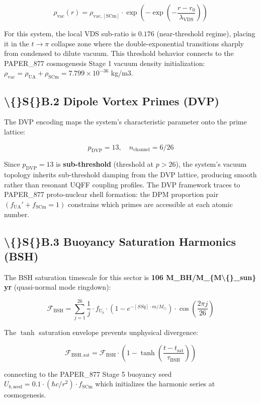 \documentclass[11pt]{article}
\begin{document}
$$\rho_{\mathrm{vac}}(r) = \rho_{\mathrm{vac,[SCm]}} \cdot \exp\!\left(-\exp\!\left(-\frac{r - r_0}{\lambda_{\mathrm{VDS}}}\right)\right)$$

For this system, the local VDS sub-ratio is $0.176$ (near-threshold regime), placing it in the $t \to \pi$ collapse zone where the double-exponential transitions sharply from condensed to dilute vacuum. This threshold behavior connects to the PAPER\_877 cosmogenesis Stage 1 vacuum density initialization: $\rho_{\mathrm{vac}} = \rho_{\mathrm{UA}} + \rho_{\mathrm{SCm}} = 7.799 \times 10^{-36}$ kg/m3.

\subsection*{\textbackslash\{\}S\{\}B.2 Dipole Vortex Primes (DVP)}

The DVP encoding maps the system's characteristic parameter onto the prime lattice:

$$p_{\mathrm{DVP}} = 13, \quad n_{\mathrm{channel}} = 6/26$$

Since $p_{\mathrm{DVP}} = 13$ is \textbf{sub-threshold} (threshold at $p > 26$), the system's vacuum topology inherits sub-threshold damping from the DVP lattice, producing smooth rather than resonant UQFF coupling profiles. The DVP framework traces to PAPER\_877 proto-nuclear shell formation: the DPM proportion pair $(f_{\mathrm{UA}}' + f_{\mathrm{SCm}} = 1)$ constrains which primes are accessible at each atomic number.

\subsection*{\textbackslash\{\}S\{\}B.3 Buoyancy Saturation Harmonics (BSH)}

The BSH saturation timescale for this sector is \textbf{106 M\_BH/M\_\{M\textbackslash\{\}\_sun\} yr} (quasi-normal mode ringdown):

$$\mathcal{F}_{\mathrm{BSH}} = \sum_{j=1}^{26} \frac{1}{j} \cdot f_U_b \cdot \left(1 - e^{-[SSq] \cdot m/M_\odot}\right) \cdot \cos\!\left(\frac{2\pi j}{26}\right)$$

The $\tanh$ saturation envelope prevents unphysical divergence:

$$\mathcal{F}_{\mathrm{BSH,sat}} = \mathcal{F}_{\mathrm{BSH}} \cdot \left(1 - \tanh\!\left(\frac{t - t_{\mathrm{sat}}}{\tau_{\mathrm{BSH}}}\right)\right)$$

connecting to the PAPER\_877 Stage 5 buoyancy seed $U_{b,\mathrm{seed}} = 0.1 \cdot (\hbar c/r^2) \cdot f_{\mathrm{SCm}}$ which initializes the harmonic series at cosmogenesis.
\end{document}

